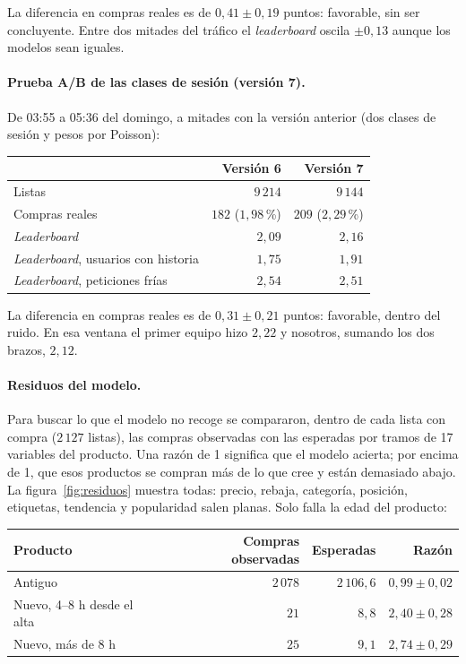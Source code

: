 \documentclass[11pt,a4paper]{article}
\begin{document}
La diferencia en compras reales es de $0{,}41\pm0{,}19$ puntos: favorable, sin ser concluyente. Entre dos
mitades del tráfico el \emph{leaderboard} oscila $\pm0{,}13$ aunque los modelos sean iguales.

\paragraph{Prueba A/B de las clases de sesión (versión 7).} De 03:55 a 05:36 del domingo, a mitades con
la versión anterior (dos clases de sesión y pesos por Poisson):

\begin{center}
\small
\begin{tabular}{lrr}
\toprule
 & Versión 6 & Versión 7\\
\midrule
Listas & $9\,214$ & $9\,144$\\
Compras reales & $182$ ($1{,}98$\,\%) & $209$ ($2{,}29$\,\%)\\
\emph{Leaderboard} & $2{,}09$ & $2{,}16$\\
\emph{Leaderboard}, usuarios con historia & $1{,}75$ & $1{,}91$\\
\emph{Leaderboard}, peticiones frías & $2{,}54$ & $2{,}51$\\
\bottomrule
\end{tabular}
\end{center}

La diferencia en compras reales es de $0{,}31\pm0{,}21$ puntos: favorable, dentro del ruido. En esa
ventana el primer equipo hizo $2{,}22$ y nosotros, sumando los dos brazos, $2{,}12$.

\paragraph{Residuos del modelo.}\label{sec:nuevos} Para buscar lo que el modelo no recoge se compararon,
dentro de cada lista con compra ($2\,127$ listas), las compras observadas con las esperadas por tramos
de 17 variables del producto. Una razón de 1 significa que el modelo acierta; por encima de 1, que esos
productos se compran más de lo que cree y están demasiado abajo. La figura~\ref{fig:residuos} muestra
todas: precio, rebaja, categoría, posición, etiquetas, tendencia y popularidad salen planas. Solo falla
la edad del producto:

\begin{center}
\small
\begin{tabular}{lrrr}
\toprule
Producto & Compras observadas & Esperadas & Razón\\
\midrule
Antiguo & $2\,078$ & $2\,106{,}6$ & $0{,}99\pm0{,}02$\\
Nuevo, 4--8 h desde el alta & $21$ & $8{,}8$ & $2{,}40\pm0{,}28$\\
Nuevo, más de 8 h & $25$ & $9{,}1$ & $2{,}74\pm0{,}29$\\
\bottomrule
\end{tabular}
\end{center}
\end{document}
